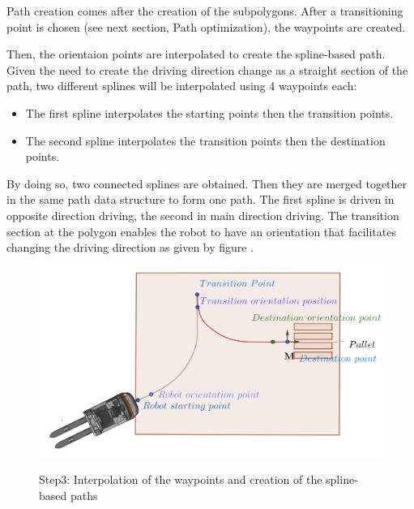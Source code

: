 Path creation comes after the creation of the subpolygons. After a transitioning point is chosen (see next section,
Path optimization), the waypoints are created. 

Then, the orientaion points are interpolated to create the spline-based path. Given the need to create the driving direction 
change as a straight section of the path, two different splines will be interpolated using 4 waypoints each:
\begin{itemize}
    \item The first spline interpolates the starting points then the transition points.
    \item The second spline interpolates the transition points then the destination points.
\end{itemize}

By doing so, two connected splines are obtained. Then they are merged together in the same path data structure to 
form one path. The first spline is driven in opposite direction driving, the second in main direction driving. 
The transition section at the polygon enables the robot to have an orientation that facilitates changing the driving direction
as given by figure .



\begin{figure}[H]
    \begin{center}
        \includegraphics[width=5in]{images/Chap2/Orientation_points_with_spline.png}\\
        \caption{Step3: Interpolation of the waypoints and creation of the spline-based paths}
        \label{Spline ori}
        \end{center}    
\end{figure}

